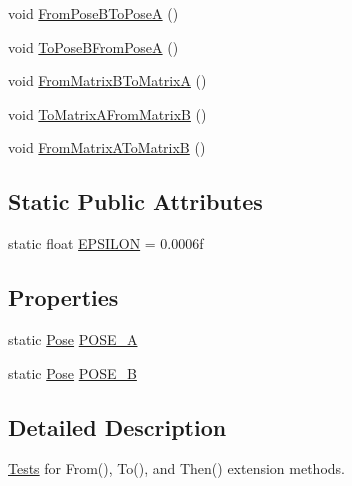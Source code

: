 \begin{DoxyCompactItemize}
\item 
void \mbox{\hyperlink{class_leap_1_1_unity_1_1_tests_1_1_from_then_tests_aa52a61764a2e5538ffc20672fbd525b3}{From\+Pose\+B\+To\+PoseA}} ()
\item 
void \mbox{\hyperlink{class_leap_1_1_unity_1_1_tests_1_1_from_then_tests_a509f04a79a3457852d987aeac2c5e3ed}{To\+Pose\+B\+From\+PoseA}} ()
\item 
void \mbox{\hyperlink{class_leap_1_1_unity_1_1_tests_1_1_from_then_tests_a1777b74b2ac9383c7dbd57a398731c8b}{From\+Matrix\+B\+To\+MatrixA}} ()
\item 
void \mbox{\hyperlink{class_leap_1_1_unity_1_1_tests_1_1_from_then_tests_a4668cdb3c7583cb15e85f6195c887353}{To\+Matrix\+A\+From\+MatrixB}} ()
\item 
void \mbox{\hyperlink{class_leap_1_1_unity_1_1_tests_1_1_from_then_tests_ab7340c746f1644dd306c8c2bd0fb8494}{From\+Matrix\+A\+To\+MatrixB}} ()
\end{DoxyCompactItemize}
\subsection*{Static Public Attributes}
\begin{DoxyCompactItemize}
\item 
static float \mbox{\hyperlink{class_leap_1_1_unity_1_1_tests_1_1_from_then_tests_acd954e7e0d9b9f0f093ad937b37977bb}{E\+P\+S\+I\+L\+ON}} = 0.\+0006f
\end{DoxyCompactItemize}
\subsection*{Properties}
\begin{DoxyCompactItemize}
\item 
static \mbox{\hyperlink{struct_leap_1_1_unity_1_1_pose}{Pose}} \mbox{\hyperlink{class_leap_1_1_unity_1_1_tests_1_1_from_then_tests_a07ad350a3a62ca2c6113148971648368}{P\+O\+S\+E\+\_\+A}}
\item 
static \mbox{\hyperlink{struct_leap_1_1_unity_1_1_pose}{Pose}} \mbox{\hyperlink{class_leap_1_1_unity_1_1_tests_1_1_from_then_tests_a5c306c3df80368dca4fce2e03a2ab998}{P\+O\+S\+E\+\_\+B}}
\end{DoxyCompactItemize}


\subsection{Detailed Description}
\mbox{\hyperlink{namespace_leap_1_1_unity_1_1_tests}{Tests}} for From(), To(), and Then() extension methods. 

